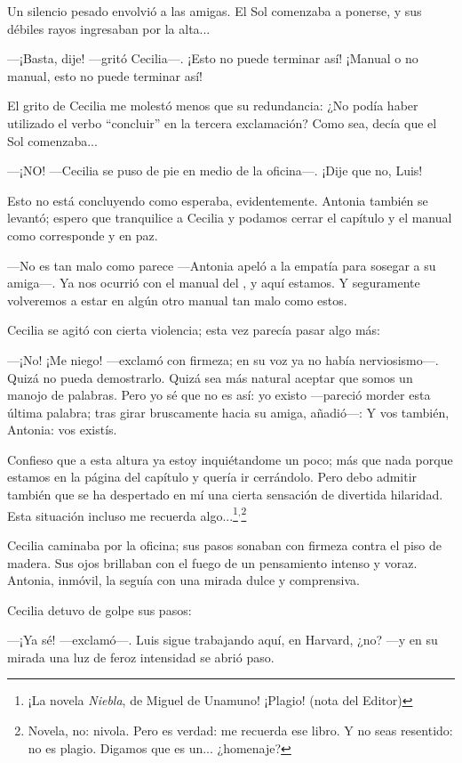 Un silencio pesado envolvió a las amigas. El Sol comenzaba a ponerse,
y sus débiles rayos ingresaban por la alta...

---¡Basta, dije! ---gritó Cecilia---. ¡Esto no puede terminar así!
¡Manual o no manual, esto no puede terminar así!

El grito de Cecilia me molestó menos que su redundancia: ¿No podía
haber utilizado el verbo ``concluir'' en la tercera exclamación? Como
sea, decía que el Sol comenzaba...

---¡NO! ---Cecilia se puso de pie en medio de la oficina---.  ¡Dije
que no, Luis!

Esto no está concluyendo como esperaba, evidentemente. Antonia también
se levantó; espero que tranquilice a Cecilia y podamos cerrar el
capítulo y el manual como corresponde y en paz.

---No es tan malo como parece ---Antonia apeló a la empatía para
sosegar a su amiga---. Ya nos ocurrió con el manual del \annielogo{},
y aquí estamos. Y seguramente volveremos a estar en algún otro manual
tan malo como estos.

Cecilia se agitó con cierta violencia; esta vez parecía pasar algo
más:

---¡No! ¡Me niego! ---exclamó con firmeza; en su voz ya no había
nerviosismo---. Quizá no pueda demostrarlo. Quizá sea más natural
aceptar que somos un manojo de palabras. Pero yo sé que no es así: yo
existo ---pareció morder esta última palabra; tras girar bruscamente
hacia su amiga, añadió---: Y vos también, Antonia: vos existís.

Confieso que a esta altura ya estoy inquiétandome un poco; más que
nada porque estamos en la página
 del
capítulo\label{sec:texto-b} y quería ir cerrándolo. Pero debo admitir
también que se ha despertado en mí una cierta sensación de divertida
hilaridad. Esta situación incluso me recuerda algo...\footnote{¡La
  novela \emph{Niebla}, de Miguel de Unamuno! ¡Plagio! (nota del
  Editor)}$^,$\footnote{Novela, no: nivola. Pero es verdad: me
  recuerda ese libro. Y no seas resentido: no es plagio. Digamos que
  es un... ¿homenaje?}

Cecilia caminaba por la oficina; sus pasos sonaban con firmeza contra
el piso de madera. Sus ojos brillaban con el fuego de un pensamiento
intenso y voraz. Antonia, inmóvil, la seguía con una mirada dulce y
comprensiva.

Cecilia detuvo de golpe sus pasos:

---¡Ya sé! ---exclamó---. Luis sigue trabajando aquí, en Harvard, ¿no?
---y en su mirada una luz de feroz intensidad se abrió paso.

